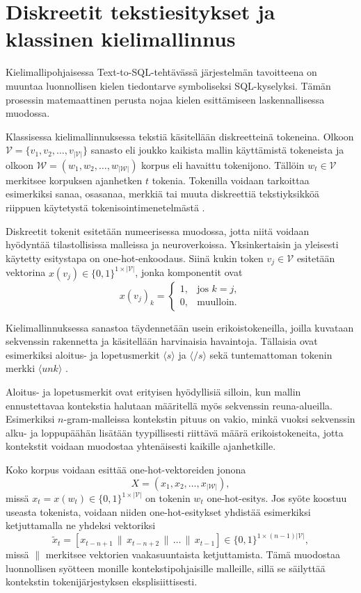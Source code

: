 \section{Diskreetit tekstiesitykset ja klassinen kielimallinnus}\label{sec:discrete}

Kielimallipohjaisessa Text-to-SQL-tehtävässä järjestelmän tavoitteena on muuntaa
luonnollisen kielen tiedontarve symboliseksi SQL-kyselyksi. Tämän prosessin
matemaattinen perusta nojaa kielen esittämiseen laskennallisessa muodossa.

Klassisessa kielimallinnuksessa tekstiä käsitellään diskreetteinä tokeneina. Olkoon
\(\mathcal{V} = \{v_1, v_2, \dots, v_{|\mathcal{V}|}\}\) sanasto eli joukko kaikista mallin
käyttämistä tokeneista ja olkoon
\(\mathcal{W} = (w_1, w_2, \dots, w_{|\mathcal{W}|})\) korpus eli havaittu tokenijono. Tällöin
\(w_t \in \mathcal{V}\) merkitsee korpuksen ajanhetken \(t\) tokenia. Tokenilla voidaan
tarkoittaa esimerkiksi sanaa, osasanaa, merkkiä tai muuta diskreettiä
tekstiyksikköä riippuen käytetystä tokenisointimenetelmästä \cite{jurafsky2023speech}.

Diskreetit tokenit esitetään numeerisessa muodossa, jotta niitä voidaan hyödyntää
tilastollisissa malleissa ja neuroverkoissa. Yksinkertaisin ja yleisesti käytetty
esitystapa on one-hot-enkoodaus. Siinä kukin token \(v_j \in \mathcal{V}\) esitetään
vektorina \(x(v_j) \in \{0,1\}^{1 \times |\mathcal{V}|}\), jonka komponentit ovat
\[
  x(v_j)_k =
  \begin{cases}
    1, & \text{jos } k = j, \\
    0, & \text{muulloin}.
  \end{cases}
\]

Kielimallinnuksessa sanastoa täydennetään usein erikoistokeneilla,
joilla kuvataan sekvenssin rakennetta ja käsitellään harvinaisia havaintoja.
Tällaisia ovat esimerkiksi aloitus- ja lopetusmerkit \(\langle s \rangle\) ja
\(\langle /s \rangle\) sekä tuntemattoman tokenin merkki \(\langle unk \rangle\) \cite{jurafsky2023speech}.

Aloitus- ja lopetusmerkit ovat erityisen hyödyllisiä silloin, kun mallin
ennustettavaa kontekstia halutaan määritellä myös sekvenssin reuna-alueilla.
Esimerkiksi \(n\)-gram-malleissa kontekstin pituus on
vakio, minkä vuoksi sekvenssin alku- ja loppupäähän lisätään tyypillisesti
riittävä määrä erikoistokeneita, jotta kontekstit voidaan muodostaa yhtenäisesti
kaikille ajanhetkille.

Koko korpus voidaan esittää one-hot-vektoreiden jonona
$$
X = (x_1, x_2, \dots, x_{|\mathcal{W}|}),
$$
missä \(x_t = x(w_t) \in \{0,1\}^{1 \times |\mathcal{V}|}\) on tokenin \(w_t\) one-hot-esitys. Jos syöte koostuu
useasta tokenista, voidaan niiden one-hot-esitykset yhdistää esimerkiksi
ketjuttamalla ne yhdeksi vektoriksi
\[
  \tilde{x}_t = [x_{t-n+1} \,\|\, x_{t-n+2} \,\|\, \dots \,\|\, x_{t-1}]
  \in \{0,1\}^{1 \times (n-1)|\mathcal{V}|},
\]
missä \(\|\) merkitsee vektorien vaakasuuntaista ketjuttamista. Tämä muodostaa
luonnollisen syötteen monille kontekstipohjaisille malleille, sillä se säilyttää
kontekstin tokenijärjestyksen eksplisiittisesti.

